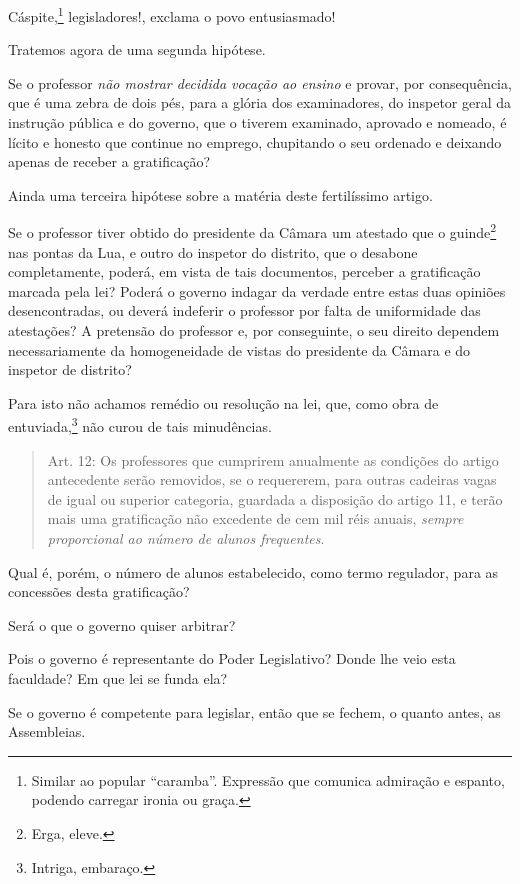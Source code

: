 Cáspite,\footnote{Similar ao popular ``caramba''. Expressão que comunica
  admiração e espanto, podendo carregar ironia ou graça.}
legisladores!, exclama o povo entusiasmado!

Tratemos agora de uma segunda hipótese.

Se o professor \emph{não mostrar decidida vocação ao ensino} e provar,
por consequência, que é uma zebra de dois pés, para a glória dos
examinadores, do inspetor geral da instrução pública e do governo, que o
tiverem examinado, aprovado e nomeado, é lícito e honesto que continue
no emprego, chupitando o seu ordenado e deixando apenas de receber a
gratificação?

Ainda uma terceira hipótese sobre a matéria deste fertilíssimo artigo.

Se o professor tiver obtido do presidente da Câmara um atestado que o
guinde\footnote{Erga, eleve.} nas pontas da Lua, e outro do inspetor
do distrito, que o desabone completamente, poderá, em vista de tais
documentos, perceber a gratificação marcada pela lei? Poderá o governo
indagar da verdade entre estas duas opiniões desencontradas, ou deverá
indeferir o professor por falta de uniformidade das atestações? A
pretensão do professor e, por conseguinte, o seu direito dependem
necessariamente da homogeneidade de vistas do presidente da Câmara e do
inspetor de distrito?

Para isto não achamos remédio ou resolução na lei, que, como obra de
entuviada,\footnote{Intriga, embaraço.} não curou de tais minudências.

\begin{quote}
Art. 12: Os professores que cumprirem anualmente as condições do artigo
antecedente serão removidos, se o requererem, para outras cadeiras vagas
de igual ou superior categoria, guardada a disposição do artigo 11, e
terão mais uma gratificação não excedente de cem mil réis anuais,
\emph{sempre proporcional ao número de alunos frequentes}.
\end{quote}

Qual é, porém, o número de alunos estabelecido, como termo regulador,
para as concessões desta gratificação?

Será o que o governo quiser arbitrar?

Pois o governo é representante do Poder Legislativo? Donde lhe veio esta
faculdade? Em que lei se funda ela?

Se o governo é competente para legislar, então que se fechem, o quanto
antes, as Assembleias.

